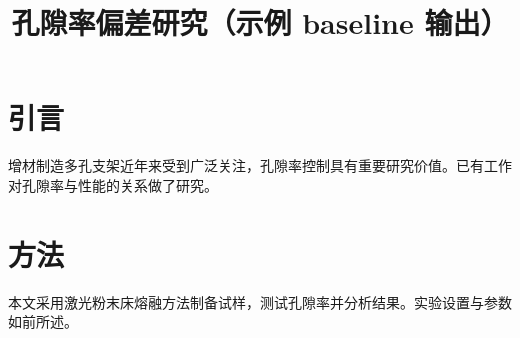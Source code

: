 \documentclass[11pt]{article}
\title{孔隙率偏差研究（示例 baseline 输出）}
\begin{document}
\maketitle

\section{引言}
增材制造多孔支架近年来受到广泛关注，孔隙率控制具有重要研究价值。已有工作对孔隙率与性能的关系做了研究\cite{wang2019}。

\section{方法}
本文采用激光粉末床熔融方法制备试样，测试孔隙率并分析结果。实验设置与参数如前所述。
\end{document}
